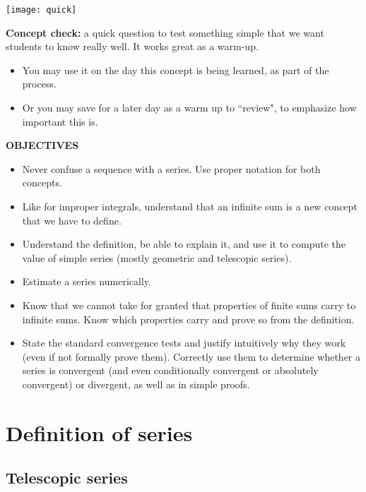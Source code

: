 \documentclass[11pt]{article}
\begin{document}
	\hspace{-1.3cm} {\texttt{[image: quick]}}\\
	\vspace{-1.5cm}	
	
	 {\bf Concept check:}  a quick question to test something simple that we want students to know really well.  It works great as a warm-up.
		\begin{itemize}
			\item You may use it on the day this concept is being learned, as part of the process.
			\item Or you may save for a later day as a warm up to ``review", to emphasize how important this is.
		\end{itemize}

\vspace{5mm}

{\bf OBJECTIVES}

	\begin{itemize}
		\item Never confuse a sequence with a series.  Use proper notation for both concepts.
		\item Like for improper integrals, understand that an infinite sum is a new concept that we have to define.  
		\item Understand the definition, be able to explain it, and use it to compute the value of simple series (mostly geometric and telescopic series).  
		\item Estimate a series numerically.
		\item Know that we cannot take for granted that properties of finite sums carry to infinite sums.  Know which properties carry and prove so from the definition.
		\item  State the standard convergence tests and justify intuitively why they work (even if not formally prove them).  Correctly use them to determine whether a series is convergent (and even conditionally convergent or absolutely convergent) or divergent, as well as in simple proofs.
	\end{itemize}
\vspace{3mm}

\tableofcontents

\newpage
\section{Definition of series}
\subsection{Telescopic series}
\end{document}
